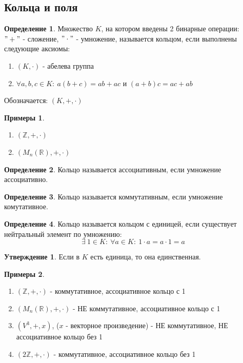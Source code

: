 \documentclass[a4paper, 12pt]{article}
\newcommand{\R}{\mathbb R}
\newcommand{\Z}{\mathbb Z}
\newcommand\tab[1][.5cm]{\hspace*{#1}}
\theoremstyle{definition}
\newtheorem*{definition}{Определение}
\newtheorem*{subtheorem}{Утверждение}
\newtheorem*{example}{Примеры}
\begin{document}
  \subsection{Кольца и поля}
  \begin{definition}
    Множество $K$, на котором введены 2 бинарные операции:\\ $"+"$ - сложение, $"\cdot"$ - умножение, называется кольцом, если выполнены следующие аксиомы:
    \begin{enumerate}
      \item $(K, \cdot)$ - абелева группа
      \item $\forall a,b,c \in K: \ a(b+c) = ab+ac$ и $(a+b)c = ac+ab$   
    \end{enumerate}
    Обозначается: $(K, +, \cdot)$
  \end{definition} 
  \begin{example}\tab
    \begin{enumerate}
      \item $(\Z, +, \cdot)$
      \item $(M_n(\R), +, \cdot)$
    \end{enumerate}
  \end{example}
  \begin{definition}
    Кольцо называется ассоциативным, если умножение ассоциативно.
  \end{definition}
  \begin{definition}
    Кольцо называется коммутативным, если умножение комутативное.
  \end{definition}
  \begin{definition}
    Кольцо называется кольцом с единицей, если существует нейтральный элемент по умножению:
    $$\exists \ 1 \in K: \ \forall a\in K: \ 1 \cdot a = a \cdot 1 = a$$ 
  \end{definition}
  \begin{subtheorem}
    Если в $K$ есть единица, то она единственная. 
  \end{subtheorem} 
  \begin{example} \tab
    \begin{enumerate}
      \item $(\Z, +, \cdot)$ - коммутативное, ассоциативное кольцо с 1
      \item $(M_n(\R), +, \cdot)$ - НЕ коммутативное, ассоциативное кольцо с 1
      \item $(V^3,+, x)$, ($x$ - векторное произведение) - НЕ коммутативное, НЕ ассоциативное кольцо без 1
      \item $(2\Z, +, \cdot)$ -  коммутативное, ассоциативное кольцо без 1
    \end{enumerate}
  \end{example}
\end{document}
